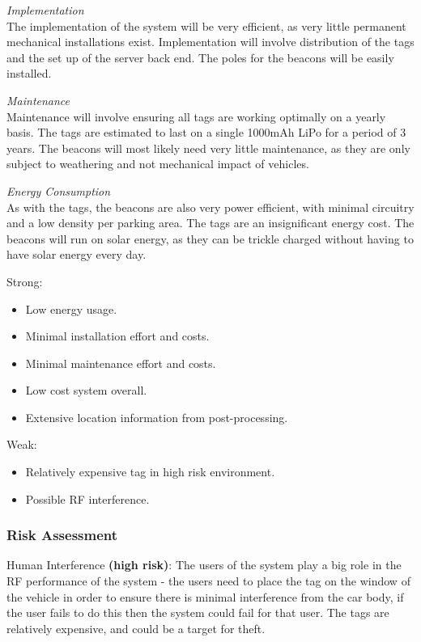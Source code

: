 \textit{Implementation}\\
The implementation of the system will be very efficient, as very little permanent mechanical installations exist. Implementation will involve distribution of the tags and the set up of the server back end. The poles for the beacons will be easily installed. 

\newpage
\textit{Maintenance}\\
Maintenance will involve ensuring all tags are working optimally on a yearly basis. The tags are estimated to last on a single 1000mAh LiPo for a period of 3 years. The beacons will most likely need very little maintenance, as they are only subject to weathering and not mechanical impact of vehicles. 

\textit{Energy Consumption}\\
As with the tags, the beacons are also very power efficient, with minimal circuitry and a low density per parking area. The tags are an insignificant energy cost. The beacons will run on solar energy, as they can be trickle charged without having to have solar energy every day.

Strong:
\begin{itemize}
\item Low energy usage.
\item Minimal installation effort and costs.
\item Minimal maintenance effort and costs.
\item Low cost system overall.
\item Extensive location information from post-processing.
\end{itemize}

Weak:
\begin{itemize}
\item Relatively expensive tag in high risk environment.
\item Possible RF interference.
\end{itemize}


\subsubsection{Risk Assessment}
Human Interference \textbf{(high risk)}: The users of the system play a big role in the RF performance of the system - the users need to place the tag on the window of the vehicle in order to ensure there is minimal interference from the car body, if the user fails to do this then the system could fail for that user. The tags are relatively expensive, and could be a target for theft.

